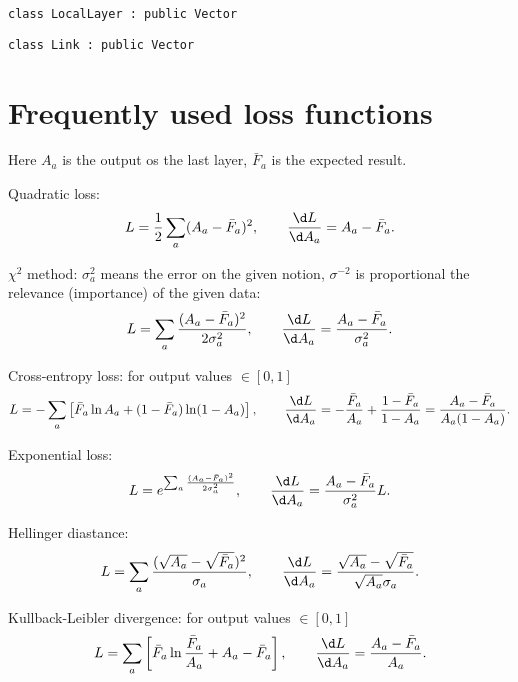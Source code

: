 \documentclass{article}
\begin{document}
\begin{center}
  \texttt{class LocalLayer : public Vector}
\end{center}

\begin{center}
    \texttt{class Link : public Vector}
\end{center}


\section{Frequently used loss functions}
\label{sec:FULoss}

Here $A_a$ is the output os the last layer, $\bar F_a$ is the expected
result.

Quadratic loss:
\begin{equation}
  L= \frac12 \sum_a (A_a-\bar F_a)^2,\qquad \frac{\d L}{\d A_a} = A_a-\bar F_a.
\end{equation}

$\chi^2$ method: $\sigma_a^2$ means the error on the given notion,
$\sigma^{-2}$ is proportional the relevance (importance) of the given data:
\begin{equation}
  L=  \sum_a \frac{(A_a-\bar F_a)^2}{2\sigma_a^2} ,\qquad \frac{\d
    L}{\d A_a} = \frac{A_a-\bar F_a}{\sigma_a^2}.
\end{equation}

Cross-entropy loss: for output values $\in[0,1]$
\begin{equation}
  L=-\sum_a\left[ \bar F_a \ln A_a + (1-\bar F_a)\ln
    (1-A_a)\right],\qquad \frac{\d L}{\d A_a} = -\frac{\bar F_a}{A_a} +
  \frac{1-\bar F_a}{1-A_a} =  \frac{A_a-\bar F_a}{A_a(1-A_a)}.
\end{equation}

Exponential loss:
\begin{equation}
  L=  e^{\sum_a \frac{(A_a-\bar F_a)^2}{2\sigma_a^2} },\qquad
  \frac{\d L}{\d A_a} = \frac{A_a-\bar F_a}{\sigma_a^2} L.
\end{equation}

Hellinger diastance:
\begin{equation}
  L=  \sum_a \frac{(\sqrt{A_a}-\sqrt{\bar F_a})^2}{\sigma_a},
  \qquad \frac{\d L}{\d A_a} = \frac{\sqrt{A_a}-\sqrt{\bar
      F_a}}{\sqrt{A_a}\sigma_a}.
\end{equation}

Kullback-Leibler divergence: for output values $\in[0,1]$
\begin{equation}
  L= \sum_a\left[ \bar F_a\ln\frac{\bar F_a}{A_a} + A_a-\bar
    F_a\right],\qquad \frac{\d L}{\d A_a} = \frac{A_a-{\bar F_a}}{A_a}.
\end{equation}
\end{document}
